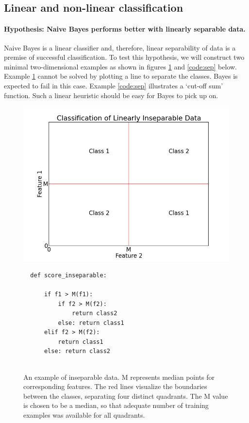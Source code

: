 \documentclass[12pt,notitlepage,twoside]{scrreprt}
\begin{document}
\subsection{Linear and non-linear classification}
\paragraph{Hypothesis: Naive Bayes performs better with linearly separable data.}

Naive Bayes is a linear classifier and, therefore, linear separability of data is a
premise of successful classification. To test this hypothesis, we will construct two
minimal two-dimensional examples as shown in figures \ref{code:insep} and \ref{code:sep}
below. Example \ref{code:insep} cannot be solved by plotting a line to separate the
classes. Bayes is expected to fail in this case. Example \ref{code:sep} illustrates a
`cut-off sum' function. Such a linear heuristic should be easy for Bayes to pick up on.

\begin{figure}[h!]
\begin{minipage}[b]{0.55\linewidth}
  \includegraphics[width=1.2\linewidth]{figs/gen_insep.png}
\end{minipage}
\hspace{0.5cm}
\begin{minipage}[b]{0.4\linewidth}
\begin{verbatim}
  def score_inseparable:

      if f1 > M(f1):
          if f2 > M(f2):
              return class2
          else: return class1
      elif f2 > M(f2): 
          return class1
      else: return class2


\end{verbatim}
\end{minipage}
\caption{An example of inseparable data. M represents median points for corresponding
features.  The red lines visualize the boundaries between the classes, separating four
distinct quadrants. The M value is chosen to be a median, so that adequate number of
training examples was available for all quadrants.  \label{code:insep}}
\end{figure}
\end{document}
